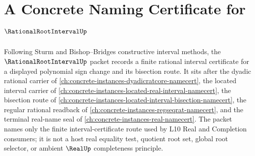 \chapter{A Concrete Naming Certificate for $\RationalRootIntervalUp$}
\label{ch:concrete-instances-rational-root-interval-namecert}

Following Sturm and Bishop--Bridges constructive interval methods, the $\RationalRootIntervalUp$ packet records a finite rational interval certificate for a displayed polynomial sign change and its bisection route. It sits after the dyadic rational carrier of \autoref{ch:concrete-instances-dyadicratcore-namecert}, the located interval carrier of \autoref{ch:concrete-instances-located-real-interval-namecert}, the bisection route of \autoref{ch:concrete-instances-located-interval-bisection-namecert}, the regular rational readback of \autoref{ch:concrete-instances-regseqrat-namecert}, and the terminal real-name seal of \autoref{ch:concrete-instances-real-namecert}. The packet names only the finite interval-certificate route used by L10 Real and Completion consumers; it is not a host real equality test, quotient root set, global root selector, or ambient $\RealUp$ completeness principle.

